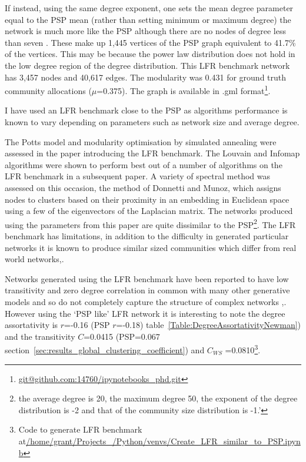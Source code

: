 If instead, using the same degree exponent, one sets the mean degree parameter equal to the PSP mean (rather than setting minimum or maximum degree) the network is much more like the PSP although there are no nodes of degree less than seven . These make up 1,445 vertices of the PSP graph equivalent to 41.7\% of the vertices. This may be because the power law distribution does not hold in the low degree region of the degree distribution. This LFR benchmark network has 3,457 nodes and 40,617 edges.
The modularity was 0.431 for ground truth community allocations ($\mu$=0.375). The graph is available in .gml format\footnote{\url{git@github.com:14760/ipynotebooks_phd.git}}.

I have used an LFR benchmark close to the PSP as algorithms performance is known to vary depending on parameters such as network size and average degree\cite{wang2017comparison}.

The Potts model\cite{reichardt2004detecting} and modularity optimisation by simulated annealing\cite{guimera2004modularity} were assessed in the paper introducing the LFR benchmark\cite{lancichinetti2008benchmark}. The Louvain and Infomap algorithms were shown to perform best out of a number of algorithms on the LFR benchmark in a subsequent paper\cite{lancichinetti2009community}. A variety of spectral method was assessed on this occasion, the method of Donnetti and Munoz, which assigns nodes to clusters based on their proximity in an embedding in Euclidean space using a few of the eigenvectors of the Laplacian matrix\cite{donetti2004detecting}. The networks produced using the parameters from this paper\cite{lancichinetti2009community} are quite dissimilar to the PSP\footnote{\tiny the average degree is 20, the maximum degree 50, the exponent of the degree distribution is -2 and that of the community size distribution is -1.'\cite{lancichinetti2009community}}.
 The LFR benchmark has limitations, in addition to the difficulty in generated particular networks it is known to produce similar sized communities which differ from  real world networks\cite{orman2013towards},\cite{aldecoa2013exploring}. 

Networks generated using the LFR benchmark have been reported to have low transitivity and zero degree correlation in common with many other generative models and so do not completely capture the structure of complex networks \cite{orman2013towards},\cite{orman2009comparison}. However using the `PSP like' LFR network it is interesting to note the degree assortativity is $r$=-0.16  (PSP $r$=-0.18) table~\ref{Table:DegreeAssortativityNewman}) and the transitivity $C$=0.0415  (PSP=0.067 section~\ref{sec:results_global_clustering_coefficient}) and  $C_{WS}$ =0.0810\footnote{\tiny Code to generate LFR benchmark at\url{/home/grant/Projects_/Python/venvs/Create_LFR_similar_to_PSP.ipynb}}.

